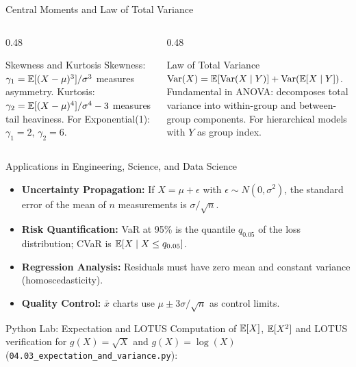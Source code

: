 \documentclass[aspectratio=169,xcolor={dvipsnames,table}]{beamer}
\begin{document}
\begin{frame}{Central Moments and Law of Total Variance}
	\vspace{-0.15cm}
	\begin{columns}[T]
		\begin{column}{0.48\textwidth}
			\begin{block}{Skewness and Kurtosis}
				\footnotesize
				Skewness: $\gamma_{1} = \mathbb{E}[(X-\mu)^{3}]/\sigma^{3}$ measures asymmetry. Kurtosis: $\gamma_{2} = \mathbb{E}[(X-\mu)^{4}]/\sigma^{4} - 3$ measures tail heaviness. For Exponential(1): $\gamma_{1} = 2$, $\gamma_{2} = 6$.
			\end{block}
		\end{column}
		\begin{column}{0.48\textwidth}
			\begin{alertblock}{Law of Total Variance}
				\footnotesize
				$\operatorname{Var}(X) = \mathbb{E}[\operatorname{Var}(X \mid Y)] + \operatorname{Var}(\mathbb{E}[X \mid Y])$. Fundamental in ANOVA: decomposes total variance into within-group and between-group components. For hierarchical models with $Y$ as group index.
			\end{alertblock}
		\end{column}
	\end{columns}
\end{frame}

\begin{frame}{Applications in Engineering, Science, and Data Science}
	\vspace{-0.1cm}
	\begin{itemize}\itemsep=0.1cm
		\item \textbf{Uncertainty Propagation:} If $X = \mu + \epsilon$ with $\epsilon \sim N(0, \sigma^2)$, the standard error of the mean of $n$ measurements is $\sigma/\sqrt{n}$. \pause
		\item \textbf{Risk Quantification:} VaR at 95\% is the quantile $q_{0.05}$ of the loss distribution; CVaR is $\mathbb{E}[X \mid X \le q_{0.05}]$. \pause
		\item \textbf{Regression Analysis:} Residuals must have zero mean and constant variance (homoscedasticity). \pause
		\item \textbf{Quality Control:} $\bar{x}$ charts use $\mu \pm 3\sigma/\sqrt{n}$ as control limits.
	\end{itemize}
\end{frame}

\begin{frame}[fragile]{Python Lab: Expectation and LOTUS}
	\vspace{-0.05cm}
	\scriptsize
	Computation of $\mathbb{E}[X]$, $\mathbb{E}[X^2]$ and LOTUS verification for $g(X) = \sqrt{X}$ and $g(X) = \log(X)$ (\texttt{04.03\_expectation\_and\_variance.py}):
	\vspace{0.02cm}
	{
	}
\end{frame}
\end{document}
